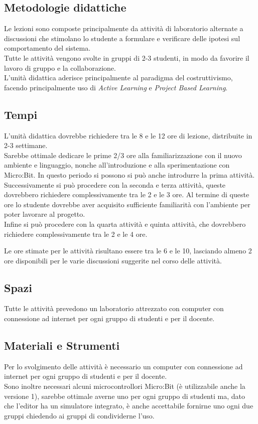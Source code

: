\documentclass[../../relazione.tex]{subfiles}
\begin{document}
\subsection{Metodologie didattiche}

Le lezioni sono composte principalmente da attività di laboratorio alternate a discussioni che stimolano lo studente a formulare e verificare delle ipotesi sul comportamento del sistema.\\
Tutte le attività vengono svolte in gruppi di 2-3 studenti, in modo da favorire il lavoro di gruppo e la collaborazione.\\
L'unità didattica aderisce principalmente al paradigma del costruttivismo, facendo principalmente uso di \textit{Active Learning} e \textit{Project Based Learning}.

\subsection{Tempi}
L'unità didattica dovrebbe richiedere tra le 8 e le 12 ore di lezione, distribuite in 2-3 settimane.\\
Sarebbe ottimale dedicare le prime 2/3 ore alla familiarizzazione con il nuovo ambiente e linguaggio, nonche all'introduzione e alla sperimentazione con Micro:Bit. In questo periodo si possono si può anche introdurre la prima attività.\\
Successivamente si può procedere con la seconda e terza attività, queste dovrebbero richiedere complessivamente tra le 2 e le 3 ore. Al termine di queste ore lo studente dovrebbe aver acquisito sufficiente familiarità con l'ambiente per poter lavorare al progetto.\\
Infine si può procedere con la quarta attività e quinta attività, che dovrebbero richiedere complessivamente tra le 2 e le 4 ore. 

Le ore stimate per le attività risultano essere tra le 6 e le 10, lasciando almeno 2 ore disponibili per le varie discussioni suggerite nel corso delle attività.

\subsection{Spazi}
Tutte le attività prevedono un laboratorio attrezzato con computer con connessione ad internet per ogni gruppo di studenti e per il docente. 

\subsection{Materiali e Strumenti}
Per lo svolgimento delle attività è necessario un computer con connessione ad internet per ogni gruppo di studenti e per il docente.\\
Sono inoltre necessari alcuni microcontrollori Micro:Bit (è utilizzabile anche la versione 1), sarebbe ottimale averne uno per ogni gruppo di studenti ma, dato che l'editor ha un simulatore integrato, è anche accettabile fornirne uno ogni due gruppi chiedendo ai gruppi di condividerne l'uso.
\end{document}
